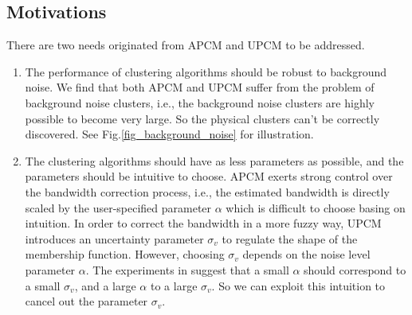 \documentclass[conference]{IEEEtran}
\theoremstyle{definition}
\begin{document}
\subsection{Motivations}
\label{sec-3-1}
There are two needs originated from APCM and UPCM to be addressed.
\begin{enumerate}
\item The performance of clustering algorithms should be robust to background noise. We find that both APCM and UPCM suffer from the problem of background noise clusters, i.e., the background noise clusters are highly possible to become very large. So the physical clusters can't be correctly discovered. See Fig.\ref{fig_background_noise} for illustration.
\item The clustering algorithms should have as less parameters as possible, and the parameters should be intuitive to choose. APCM exerts strong control over the bandwidth correction process, i.e., the estimated bandwidth is directly scaled by the user-specified parameter $\alpha$ which is difficult to choose basing on intuition. In order to correct the bandwidth in a more fuzzy way, UPCM introduces an uncertainty parameter $\sigma_v$ to regulate the shape of the membership function. However, choosing $\sigma_v$ depends on the noise level parameter $\alpha$. The experiments in \cite{hou_pcm_2016} suggest that a small $\alpha$ should correspond to a small $\sigma_v$, and a large $\alpha$ to a large $\sigma_v$. So we can exploit this intuition to cancel out the parameter $\sigma_v$.
\end{enumerate}
\end{document}
